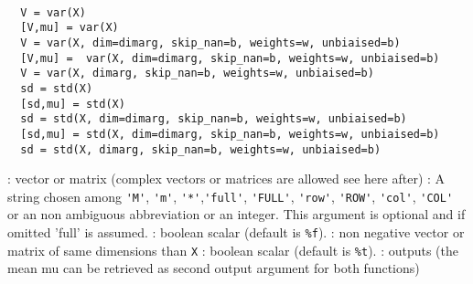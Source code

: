 
\begin{mandesc}
   \\
\end{mandesc}

\begin{calling_sequence}
\begin{verbatim}
  V = var(X)
  [V,mu] = var(X)
  V = var(X, dim=dimarg, skip_nan=b, weights=w, unbiaised=b)  
  [V,mu] =  var(X, dim=dimarg, skip_nan=b, weights=w, unbiaised=b)    
  V = var(X, dimarg, skip_nan=b, weights=w, unbiaised=b)
  sd = std(X)
  [sd,mu] = std(X)
  sd = std(X, dim=dimarg, skip_nan=b, weights=w, unbiaised=b)  
  [sd,mu] = std(X, dim=dimarg, skip_nan=b, weights=w, unbiaised=b)  
  sd = std(X, dimarg, skip_nan=b, weights=w, unbiaised=b)  
\end{verbatim}
\end{calling_sequence}
\begin{parameters}
  \begin{varlist}
    : vector or matrix (complex vectors or matrices are allowed see here after)
    : A string chosen among \verb+'M'+, \verb+'m'+, \verb+'*'+,\verb+'full'+, \verb+'FULL'+, \verb+'row'+,
    \verb+'ROW'+, \verb+'col'+, \verb+'COL'+ or an non ambiguous abbreviation or an integer. 
    This argument is optional and if omitted 'full' is assumed.
    : boolean scalar (default is \verb+%f+).
    : non negative vector or matrix of same dimensions than \verb+X+ 
    :  boolean scalar (default is \verb+%t+).
    : outputs (the mean mu can be retrieved as second output argument for both functions)
  \end{varlist}
\end{parameters}

